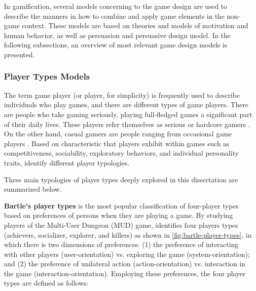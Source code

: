 In gamification, several models concerning to the game design are used to describe the manners in how to combine and apply game elements in the non-game context.
These models are based on  theories and models of motivation and human behavior, as well as persuasion and persuasive design model.
In the following subsections, an overview of most relevant game design models is presented.

\subsubsection{Player Types Models}
\label{subsec:player-types}

The term game player (or player, for simplicity) is frequently used to describe individuals who play games, and there are different types of game players.
There are people who take gaming seriously, playing full-fledged games a significant part of their daily lives. These players refer themselves as serious or hardcore gamers \cite{BosserNakatsu2006}.
On the other hand, casual gamers are people ranging from occasional game players \cite{KuittinenKultimaNiemelaPaavilainen2007}.
Based on characteristic that players exhibit within games such as competitiveness, sociability, exploratory behaviors, and individual personality traits, \cite{LawsJackson2002, NackeBatemanMandryk2014, Bartle2004, Marczewski2013} identify different player typologies. 

Three main typologies of player types deeply explored in this dissertation are summarized below.

\textbf{Bartle's player types} \cite{Bartle2004, Bartle1996} is the most popular classification of four-player types based on preferences of persons when they are playing a game.
By studying players of the Multi-User Dungeon (MUD) game,  identifies four players types (achievers, socializer, explorer, and killers) as shown in \autoref{fig:bartle-player-types}, in which there is two dimensions of preferences:
(1) the preference of interacting with other players (user-orientation) vs. exploring the game (system-orientation); and
(2) the preference of unilateral action (action-orientation) vs. interaction in the game (interaction-orientation).
Employing these preferences, the four player types are defined as follows:

